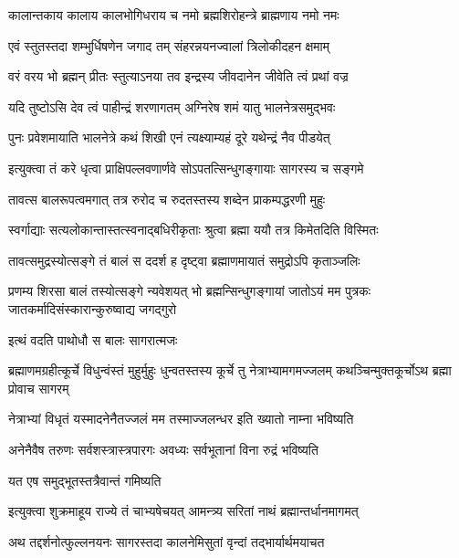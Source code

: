 \twolineshloka
{कालान्तकाय कालाय कालभोगिधराय च}
{नमो ब्रह्मशिरोहन्त्रे ब्राह्मणाय नमो नमः} %


\twolineshloka
{एवं स्तुतस्तदा शम्भुर्धिषणेन जगाद तम्}
{संहरन्नयनज्वालां त्रिलोकीदहन क्षमाम्} %

\twolineshloka
{वरं वरय भो ब्रह्मन् प्रीतः स्तुत्याऽनया तव}
{इन्द्रस्य जीवदानेन जीवेति त्वं प्रथां वज्र} %


\twolineshloka
{यदि तुष्टोऽसि देव त्वं पाहीन्द्रं शरणागतम्}
{अग्निरेष शमं यातु भालनेत्रसमुद्भवः} %


\twolineshloka
{पुनः प्रवेशमायाति भालनेत्रे कथं शिखी}
{एनं त्यक्ष्याम्यहं दूरे यथेन्द्रं नैव पीडयेत्} %


\twolineshloka
{इत्युक्त्वा तं करे धृत्वा प्राक्षिपल्लवणार्णवे}
{सोऽपतत्सिन्धुगङ्गायाः सागरस्य च सङ्गमे} %

\twolineshloka
{तावत्स बालरूपत्वमगात् तत्र रुरोद च}
{रुदतस्तस्य शब्देन प्राकम्पद्धरणी मुहुः} %

\twolineshloka
{स्वर्गाद्याः सत्यलोकान्तास्तत्स्वनाद्बधिरीकृताः}
{श्रुत्वा ब्रह्मा ययौ तत्र किमेतदिति विस्मितः} %

\twolineshloka
{तावत्समुद्रस्योत्सङ्गे तं बालं स ददर्श ह}
{दृष्ट्वा ब्रह्माणमायातं समुद्रोऽपि कृताञ्जलिः} %

\threelineshloka
{प्रणम्य शिरसा बालं तस्योत्सङ्गे न्यवेशयत्}
{भो ब्रह्मन्सिन्धुगङ्गायां जातोऽयं मम पुत्रकः}
{जातकर्मादिसंस्कारान्कुरुष्वाद्य जगद्गुरो} %



\onelineshloka
{इत्थं वदति पाथोधौ स बालः सागरात्मजः} %

\threelineshloka
{ब्रह्माणमग्रहीत्कूर्चे विधुन्वंस्तं मुहुर्मुहुः}
{धुन्वतस्तस्य कूर्चे तु नेत्राभ्यामगमज्जलम्}
{कथञ्चिन्मुक्तकूर्चोऽथ ब्रह्मा प्रोवाच सागरम्} %


\twolineshloka
{नेत्राभ्यां विधृतं यस्मादनेनैतज्जलं मम}
{तस्माज्जलन्धर इति ख्यातो नाम्ना भविष्यति} %

\twolineshloka
{अनेनैवैष तरुणः सर्वशस्त्रास्त्रपारगः}
{अवध्यः सर्वभूतानां विना रुद्रं भविष्यति} %


\onelineshloka
{यत एष समुद्भूतस्तत्रैवान्तं गमिष्यति} %


\twolineshloka
{इत्युक्त्वा शुक्रमाहूय राज्ये तं चाभ्यषेचयत्}
{आमन्त्र्य सरितां नाथं ब्रह्मान्तर्धानमागमत्} %

\twolineshloka
{अथ तद्दर्शनोत्फुल्लनयनः सागरस्तदा}
{कालनेमिसुतां वृन्दां तद्भार्यार्थमयाचत} %

